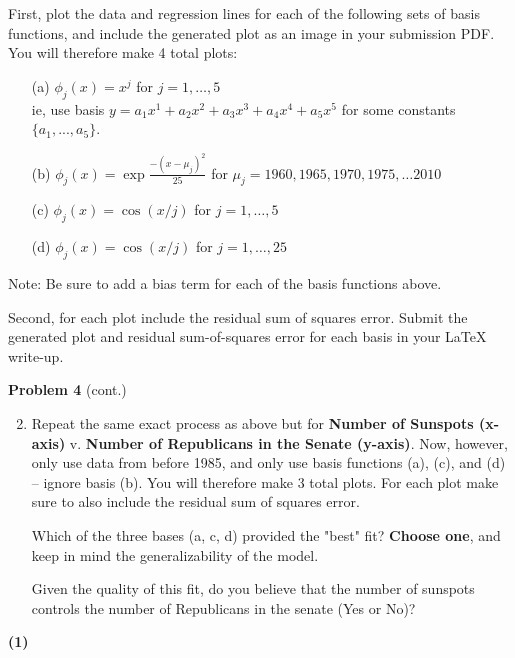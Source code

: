 \documentclass[submit]{harvardml}
\begin{document}
\begin{problem}
\begin{enumerate}
First, plot the data and regression lines for each of the following sets of basis functions, and include
the generated plot as an image in your submission PDF. You will therefore make 4 total plots:
\begin{enumerate}
  \item[(a)] $\phi_j(x) = x^j$ for $j=1, \ldots, 5$\\
    ie, use basis $y = a_1 x^1 + a_2 x^2 + a_3 x^3 + a_4 x^4 + a_5 x^5$ for some constants $\{a_1, ..., a_5\}$. 
    \item[(b)] $\phi_j(x) = \exp{\frac{-(x-\mu_j)^2}{25}}$ for $\mu_j=1960, 1965, 1970, 1975, \ldots 2010$
  \item[(c)] $\phi_j(x) = \cos(x / j)$ for $j=1, \ldots, 5$
  \item[(d)] $\phi_j(x) = \cos(x / j)$ for $j=1, \ldots, 25$
\end{enumerate}
\vspace{-2mm}
{\footnotesize * Note: Be sure to add a bias term for each of the basis functions above.}

Second, for each plot include the residual sum of squares error. Submit the generated plot and residual sum-of-squares error for each basis in your LaTeX write-up.
\end{enumerate}

\end{problem}

\begin{framed}
\noindent\textbf{Problem 4} (cont.)\\
\begin{enumerate}
\setcounter{enumi}{1}
\item Repeat the same exact process as above but for \textbf{Number of Sunspots (x-axis)} v. \textbf{Number of Republicans in the Senate (y-axis)}. 
Now, however, only use data from before 1985, and only use basis functions (a), (c), and (d) -- ignore basis (b). You will therefore make 3 total plots. For each plot make sure to also include the residual sum of squares error.

Which of the three bases (a, c, d) provided the "best" fit? \textbf{Choose one}, and keep in mind the generalizability of the model. 

Given the quality of this fit, do you believe that the number of sunspots controls the number of Republicans in the senate (Yes or No)?
\end{enumerate}
\end{framed}

\textbf{(1)}
\end{document}
